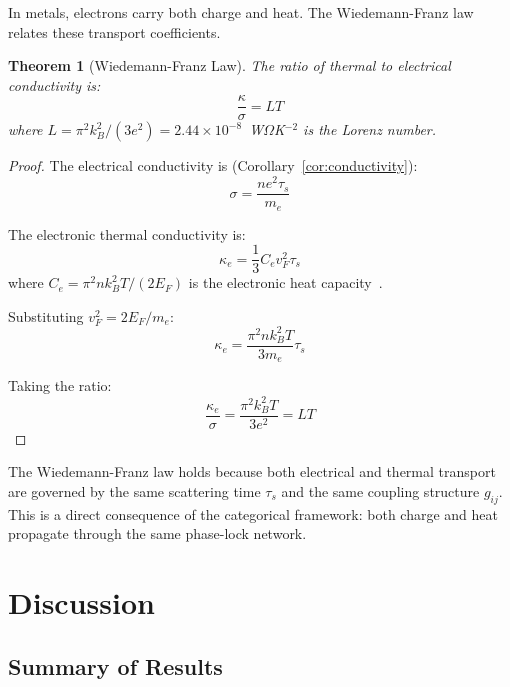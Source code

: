 \documentclass[twocolumn,showpacs,preprintnumbers,amsmath,amssymb,prd]{revtex4-2}
\newtheorem{theorem}{Theorem}[section]
\newcommand{\taus}{\tau_s}
\begin{document}
In metals, electrons carry both charge and heat. The Wiedemann-Franz law relates these transport coefficients.

\begin{theorem}[Wiedemann-Franz Law]
\label{thm:wiedemann_franz}
The ratio of thermal to electrical conductivity is:
\begin{equation}
\frac{\kappa}{\sigma} = LT
\label{eq:wiedemann_franz}
\end{equation}
where $L = \pi^2 k_B^2/(3e^2) = 2.44 \times 10^{-8}$~W$\Omega$K$^{-2}$ is the Lorenz number.
\end{theorem}

\begin{proof}
The electrical conductivity is (Corollary~\ref{cor:conductivity}):
\begin{equation}
\sigma = \frac{ne^2\taus}{m_e}
\end{equation}

The electronic thermal conductivity is:
\begin{equation}
\kappa_e = \frac{1}{3}C_e v_F^2 \taus
\end{equation}
where $C_e = \pi^2 nk_B^2 T/(2E_F)$ is the electronic heat capacity~\cite{Ashcroft1976}.

Substituting $v_F^2 = 2E_F/m_e$:
\begin{equation}
\kappa_e = \frac{\pi^2 nk_B^2 T}{3m_e}\taus
\end{equation}

Taking the ratio:
\begin{equation}
\frac{\kappa_e}{\sigma} = \frac{\pi^2 k_B^2 T}{3e^2} = LT
\end{equation}
\end{proof}

The Wiedemann-Franz law holds because both electrical and thermal transport are governed by the same scattering time $\taus$ and the same coupling structure $g_{ij}$. This is a direct consequence of the categorical framework: both charge and heat propagate through the same phase-lock network.


\section{Discussion}
\label{sec:discussion}

\subsection{Summary of Results}
\end{document}
